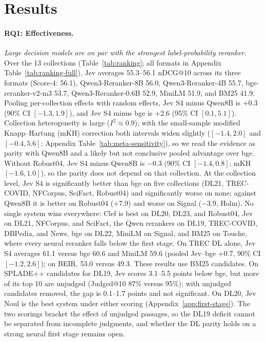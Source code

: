 \section{Results}



\paragraph{RQ1: Effectiveness.}
\emph{Large decision models are on par with the strongest label-probability reranker.}
Over the 13 collections (Table~\ref{tab:ranking}; all formats in Appendix Table~\ref{tab:ranking-full}), Jev averages 55.3--56.1 nDCG@10 across its three formats (Score-4: 56.1), Qwen3-Reranker-8B 56.0, Qwen3-Reranker-4B 55.7, bge-reranker-v2-m3 53.7, Qwen3-Reranker-0.6B 52.9, MiniLM 51.9, and BM25 41.9.
Pooling per-collection effects with random effects, Jev S4 minus Qwen8B is $+0.3$ (90\% CI $[-1.3,1.9]$), and Jev S4 minus bge is $+2.6$ (95\% CI $[0.1,5.1]$). Collection heterogeneity is large ($I^2\approx0.9$); with the small-sample modified Knapp--Hartung (mKH) correction both intervals widen slightly ($[-1.4,2.0]$ and $[-0.4,5.6]$; Appendix Table~\ref{tab:meta-sensitivity}), so we read the evidence as parity with Qwen8B and a likely but not conclusive pooled advantage over bge. Without Robust04, Jev S4 minus Qwen8B is $-0.3$ (90\% CI $[-1.4,0.8]$; mKH $[-1.6,1.0]$), so the parity does not depend on that collection.
At the collection level, Jev S4 is significantly better than bge on five collections (DL21, TREC-COVID, NFCorpus, SciFact, Robust04) and significantly worse on none; against Qwen8B it is better on Robust04 ($+7.9$) and worse on Signal ($-3.9$, Holm). No single system wins everywhere: Clef is best on DL20, DL23, and Robust04, Jev on DL21, NFCorpus, and SciFact, the Qwen rerankers on DL19, TREC-COVID, DBPedia, and News, bge on DL22, MiniLM on Signal, and BM25 on Touche, where every neural reranker falls below the first stage.
On TREC DL alone, Jev S4 averages 61.1 versus bge 60.6 and MiniLM 59.6 (pooled Jev--bge $+0.7$, 90\% CI $[-1.2,2.6]$); on BEIR, 53.0 versus 49.3. These results use BM25 candidates. On SPLADE++ candidates for DL19, Jev scores 3.1--5.5 points below bge, but more of its top 10 are unjudged (Judged@10 87\% versus 95\%); with unjudged candidates removed, the gap is 0.1--1.7 points and not significant. On DL20, Jev Noul is the best system under either scoring (Appendix~\ref{app:first-stage}). The two scorings bracket the effect of unjudged passages, so the DL19 deficit cannot be separated from incomplete judgments, and whether the DL parity holds on a strong neural first stage remains open.


